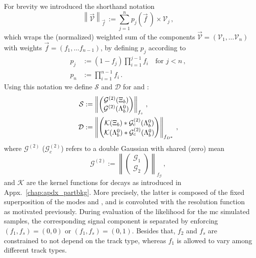 For brevity we introduced the shorthand notation 
\begin{equation*}
    \left\lVert \vec{\mathcal{V}} \right\rVert_{\vec f} \, := \sum_{j=1}^n p_j \! \left( \vec{f}\, \right) \times \mathcal{V}_j \,,
\end{equation*}
which wraps the (normalized) weighted sum of the components $\vec{\mathcal{V}} = (\mathcal{V}_1, \ldots \mathcal{V}_n)$ with weights $\vec{f} = (f_1, \ldots f_{n-1})$, by defining $p_j$ according to
\begin{align*}
    p_j &:= (1-f_j) \prod_{i=1}^{j-1} f_i \quad \text{for } j < n \,, \\
    p_n &:= \prod_{i=1}^{n-1} f_i \,.
\end{align*}
Using this notation we define $\mathcal{S}$ and $\mathcal{D}$ for \Lb and \Xib:
\begin{align*}
    \mathcal{S} &:= \left\lVert \begin{pmatrix} \mathcal{G}^{(2)}({{\Xi}_{b}}) \\ \mathcal{G}^{(2)}({{\Lambda}^0_{b}}) \end{pmatrix} \right\rVert_{f_s} \,, \\
    \mathcal{D} &:= \left\lVert \begin{pmatrix} \mathcal{K}({{\Xi}_{b}}) * \mathcal{G}^{(2)}_c({{\Lambda}^0_{b}}) \\ \mathcal{K}({{\Lambda}^0_{b}}) * \mathcal{G}^{(2)}_c({{\Lambda}^0_{b}}) \end{pmatrix} \right\rVert_{f_{{D}^*}} \,,
\end{align*}
where $\mathcal{G}^{(2)}$ ($\mathcal{G}_c^{(2)}$) refers to a double Gaussian with shared (zero) mean
\begin{equation*}
    \mathcal{G}^{(2)} := \left\lVert \begin{pmatrix} \mathcal{G}_1 \\ \mathcal{G}_2 \end{pmatrix} \right\rVert_{f_\mathcal{G}} \,,
\end{equation*}
and $\mathcal{K}$ are the kernel functions for \decay{\Lb/\Xibz}{\Dstarz\Lz} decays as introduced in Appx.~\ref{chap:apdx_partbkg}.
More precisely, the latter is composed of the fixed superposition of the \Dstarz modes \decay{\Dstarz}{\Dz\piz} and \decay{\Dstarz}{\Dz\Pgamma}, and is convoluted with the resolution function as motivated previously.
During evaluation of the likelihood for the \gls{mc} simulated samples, the corresponding signal component is separated by enforcing $(f_1,f_s)=(0,0)$ or $(f_1,f_s)=(0,1)$.
Besides that, $f_2$ and $f_s$ are constrained to not depend on the track type, whereas $f_1$ is allowed to vary among different track types.
